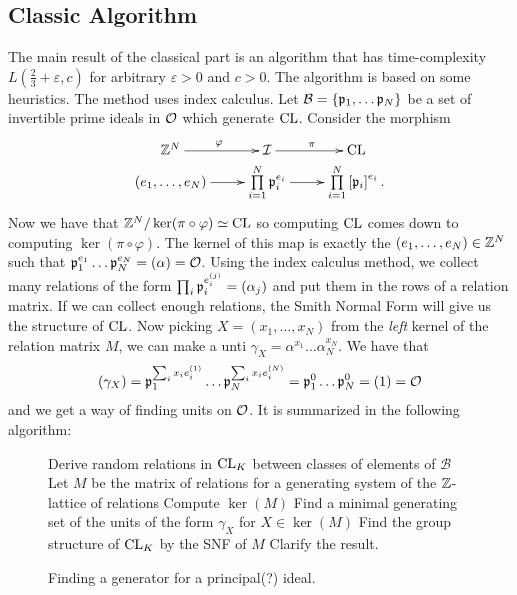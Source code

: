 \subsection{Classic Algorithm}
The main result of the classical part\cite{Find Generator Classic} is an algorithm that has time-complexity \(L(\frac{2}{3} + \varepsilon, c)\) for arbitrary \(\varepsilon > 0\) and \(c>0\). The algorithm is based on some heuristics. The method uses index calculus. Let \(\mathcal{B} = \{\mathfrak{p}_1,\dots\mathfrak{p}_N\}\) be a set of invertible prime ideals in \(\mathcal{O}\) which generate \(\text{CL}\). Consider the morphism
\[
    \xymatrix@R-2pc{
        \ZZ^N\ar[r]^{\varphi} & \mathcal{I}\ar[r]^{\pi} & \CL \\
        (e_1,\dots,e_N)\ar[r] &  \prod\limits_{i = 1}^N\frakp_i^{e_i}\ar[r] & \prod\limits_{i = 1}^N\left[\frakp_i \right]^{e_i}.
    }
\]
Now we have that \(\mathbb{Z}^N/\ker (\pi\circ\varphi )\simeq\text{CL}\) so computing \(\text{CL}\) comes down to computing \(\ker (\pi\circ\varphi)\). The kernel of this map is exactly the \((e_1,\dots ,e_N)\in\mathbb{Z}^N\) such that \(\mathfrak{p}_1^{e_1}\dots\mathfrak{p}_N^{e_N} = (\alpha) = \mathcal{O}\). Using the index calculus method, we collect many relations of the form \(\prod_i\mathfrak{p}_i^{{e_i^{(j)}}} = (\alpha_j)\) and put them in the rows of a relation matrix. If we can collect enough relations, the Smith Normal Form  will give us the structure of \(\text{CL}\). Now picking \(X = (x_1,\dots,x_N)\) from the \emph{left} kernel of the relation matrix \(M\), we can make a unti \(\gamma_X = \alpha^{x_1}\dots\alpha_N^{x_N}\). We have that 
\begin{align*}
    (\gamma_X) = \mathfrak{p}_1^{\sum_i x_ie_i^{(1)}}\dots\mathfrak{p}_N^{\sum_i x_ie_i^{(N)}} = \mathfrak{p}_1^0\dots\mathfrak{p}_N^0 = (1) = \mathcal{O} 
\end{align*}
and we get a way of finding units on \(\mathcal{O}\). It is summarized in the following algorithm:
\begin{figure}
    \centering
    \begin{algorithm}[H]
     \DontPrintSemicolon
     Derive random relations in \(\text{CL} _K\) between classes of elements of \(\mathcal{B}\)\;
     Let \(M\) be the matrix of relations for a generating system of the \(\mathbb{Z}\)-lattice of relations\;
     Compute \(\ker (M)\)\;
     Find a minimal generating set of the units of the form \(\gamma_X\) for \(X\in\ker (M)\)\;
     Find the group structure of \(\text{CL} _K\) by the SNF of \(M\)\;
     Clarify the result.
     \caption{Finding a generator for a principal(?) ideal.}
    \end{algorithm}
\end{figure}
